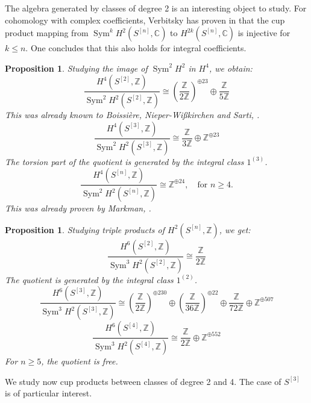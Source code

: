 \documentclass{amsart}
\DeclareMathOperator{\Sym}{Sym}
\newcommand{\hilb}[1]{^{[#1]}}
\newcommand{\One}{1}
\newcommand{\IC}{\mathbb{C}}
\newcommand{\IZ}{\mathbb{Z}}
\theoremstyle{plain}
\newtheorem{proposition}[theorem]{Proposition}
\theoremstyle{definition}
\theoremstyle{remark}
\begin{document}
The algebra generated by classes of degree 2 is an interesting object to study. For cohomology with complex coefficients, Verbitsky has proven in \cite{Verbitsky} that the cup product mapping from $\Sym^k H^2(S\hilb{n},\IC)$ to $H^{2k}(S\hilb{n},\IC)$ is injective for $k\leq n$. One concludes that this also holds for integral coefficients.
\begin{proposition} Studying the image of $\Sym^2H^2$ in $H^4$, we obtain: 
$$
\frac{H^4(S\hilb{2},\IZ)}{\Sym^2 H^2(S\hilb{2},\IZ)}  \cong \left(\frac{\IZ}{2\IZ}\right)^{\oplus 23} \oplus \frac{\IZ}{5\IZ}
$$
This was already known to Boissi\`{e}re, Nieper-Wi\ss kirchen and Sarti, \cite[Prop. 3]{BNS}.
$$
\frac{H^4(S\hilb{3},\IZ)}{\Sym^2 H^2(S\hilb{3},\IZ)} \cong \frac{\IZ}{3\IZ} \oplus \IZ^ {\oplus 23} 
$$
The torsion part of the quotient is generated by the integral class $\One^{(3)}$.
$$
\frac{H^4(S\hilb{n},\IZ)}{\Sym^2 H^2(S\hilb{n},\IZ)} \cong  \IZ^ {\oplus 24}, \quad \text{for }n\geq 4.
$$
This was already proven by Markman, \cite[Thm. 1.10]{Markman2}.
\end{proposition}
\begin{proposition} Studying triple products of $H^2(S\hilb{n},\IZ)$, we get:
$$
\frac{H^6(S\hilb{2},\IZ)}{\Sym^3 H^2(S\hilb{2},\IZ)} \cong 
\frac{\IZ}{2\IZ}
$$
The quotient is generated by the integral class $\One^{(2)}$.
$$
\frac{H^6(S\hilb{3},\IZ)}{\Sym^3 H^2(S\hilb{3},\IZ)} \cong  \left(\frac{\IZ}{2\IZ}\right)^{\oplus 230}\oplus \left(\frac{\IZ}{36\IZ}\right)^{\oplus 22}\oplus \frac{\IZ}{72\IZ} \oplus \IZ^{\oplus 507}
$$
$$
\frac{H^6(S\hilb{4},\IZ)}{\Sym^3 H^2(S\hilb{4},\IZ)} \cong  \frac{\IZ}{2\IZ} \oplus \IZ^{\oplus 552}
$$
For $n\geq 5$, the quotient is free.
\end{proposition}
We study now cup products between classes of degree 2 and 4. The case of $S\hilb{3}$ is of particular interest.
\end{document}
